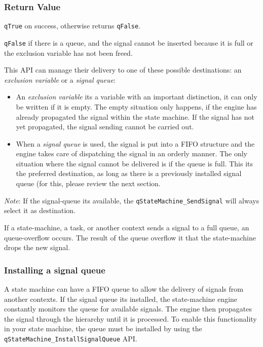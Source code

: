 \subsubsection*{Return Value}
\lstinline{qTrue} on success, otherwise returns \lstinline{qFalse}.

\lstinline{qFalse} if there is a queue, and the signal cannot be inserted because it is full or the exclusion variable has not been freed.

\hrulefill
\medskip

This API can manage their delivery to one of these possible destinations: an \textit{exclusion variable} or a \textit{signal queue}:
\begin{itemize}
    \item An \textit{exclusion variable} its a variable with an important distinction, it can only be written if it is empty. The empty situation only happens, if the engine has already propagated the signal within the state machine. If the signal has not yet propagated, the signal sending cannot be carried out.
    \item When a \textit{signal queue} is used, the signal is put into a FIFO structure and the engine takes care of dispatching the signal in an orderly manner. The only situation where the signal cannot be delivered is if the queue is full.
    This its the preferred destination, as long as there is a previously installed signal queue (for this, please review the next section.
\end{itemize}

\begin{tcolorbox}
\ArrowBoldDownRight \textit{Note}: If the signal-queue its available, the \lstinline{qStateMachine_SendSignal} will always select it as destination.
\end{tcolorbox}

\begin{tcolorbox}
\ArrowBoldDownRight If a state-machine, a task, or another context sends a signal to a full queue, an queue-overflow occurs. The result of the queue overflow it that the state-machine drops the new signal. 
\end{tcolorbox}

\subsubsection{Installing a signal queue}
A state machine can have a FIFO queue to allow the delivery of signals from another contexts. If the signal queue its installed, the state-machine engine constantly monitors the queue for available signals. The engine then propagates the signal through the hierarchy until it is processed. 
To enable this functionality in your state machine, the queue must be installed by using the \lstinline{qStateMachine_InstallSignalQueue} API.

